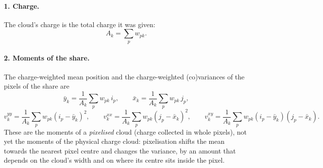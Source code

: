 \documentclass[11pt,a4paper]{article}
\begin{document}
\paragraph{1. Charge.} The cloud's charge is the total charge it was given:
\begin{equation}
A_k=\sum_p w_{pk}.
\end{equation}

\paragraph{2. Moments of the share.} The charge-weighted mean position and the charge-weighted (co)variances of the pixels of the
share are
\begin{equation}
\bar y_k=\frac{1}{A_k}\sum_p w_{pk}\,i_p,\qquad \bar x_k=\frac{1}{A_k}\sum_p w_{pk}\,j_p,
\end{equation}
\begin{equation}
v^{yy}_k=\frac{1}{A_k}\sum_p w_{pk}(i_p-\bar y_k)^2,\qquad
v^{xx}_k=\frac{1}{A_k}\sum_p w_{pk}(j_p-\bar x_k)^2,\qquad
v^{xy}_k=\frac{1}{A_k}\sum_p w_{pk}(i_p-\bar y_k)(j_p-\bar x_k).
\end{equation}
These are the moments of a \emph{pixelised} cloud (charge collected in whole pixels), not yet the moments of the physical charge
cloud: pixelisation shifts the mean towards the nearest pixel centre and changes the variance, by an amount that depends on the
cloud's width and on where its centre sits inside the pixel.
\end{document}
